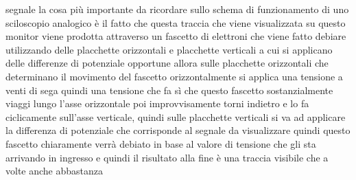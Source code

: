 {segnale la cosa più importante da ricordare sullo schema di funzionamento di uno sciloscopio analogico è il fatto che questa traccia che viene visualizzata su questo monitor viene prodotta attraverso un fascetto di elettroni che viene fatto debiare utilizzando delle placchette orizzontali e placchette verticali a cui si applicano delle differenze di potenziale opportune allora sulle placchette orizzontali che determinano il movimento del fascetto orizzontalmente si applica una tensione a venti di sega quindi una tensione che fa sì che questo fascetto sostanzialmente viaggi lungo l'asse orizzontale poi improvvisamente torni indietro e lo fa ciclicamente sull'asse verticale, quindi sulle placchette verticali si va ad applicare la differenza di potenziale che corrisponde al segnale da visualizzare quindi questo fascetto chiaramente verrà debiato in base al valore di tensione che gli sta arrivando in ingresso e quindi il risultato alla fine è una traccia visibile che a volte anche abbastanza 

}

